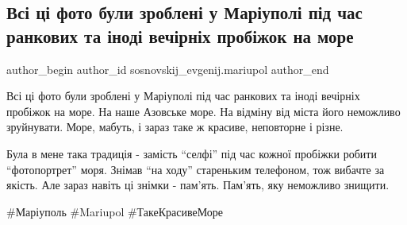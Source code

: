 
 
 
 
 

\subsection{Всі ці фото були зроблені у Маріуполі під час ранкових та іноді вечірніх пробіжок на море}
\label{sec:29_01_2023.fb.sosnovskij_evgenij.mariupol.1.vs__ts__foto_buli_zr}

\ifcmt
 author_begin
   author_id sosnovskij_evgenij.mariupol
 author_end
\fi

Всі ці фото були зроблені у Маріуполі під час ранкових та іноді вечірніх
пробіжок на море. На наше Азовське море. На відміну від міста його неможливо
зруйнувати. Море, мабуть, і зараз таке ж красиве, неповторне і різне.

Була в мене така традиція - замість \enquote{селфі} під час кожної пробіжки робити
\enquote{фотопортрет} моря. Знімав \enquote{на ходу} стареньким телефоном, тож вибачте за
якість. Але зараз навіть ці знімки - пам'ять. Пам'ять, яку неможливо знищити.

\#Маріуполь \#Mariupol \#ТакеКрасивеМоре

